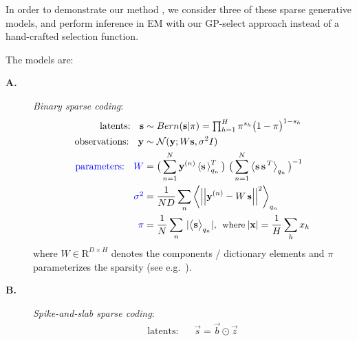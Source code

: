 %
In order to demonstrate our method , we consider three of these
 sparse generative models, and perform inference in EM with our GP-select approach instead of a hand-crafted selection function.

The models  are:
%
\begin{description}
%
\item[\textbf{A.}] \textit{Binary sparse coding}:
%
\vspace{-.1cm}
\begin{align}
\text{latents: } \,\,\,         \vec{s} &\sim Bern(\vec{s} | \pi) = \disT\prod_{h=1}^H \pi^{s_h} \big( 1 - \pi \big)^{1-s_h}\nonumber \\
\text{observations:  }\,\,\,    \vec{y} &\sim \mathcal{N}(\vec{y}; W\vec{s}, \sigma^2\One)\nonumber \\ 
\rev{\text{parameters: }} \,\,\,  %
\disT{}\rev{W} &= \big( \sum_{n=1}^{N} \vec{y}^{(n)} \E{\vec{s}\,}^T_{q_n} \big)\ \big( \sum_{n=1}^{N} \left< \vec{s}\,\vec{s}^{\,T}\right>_{q_n}\big)^{-1}\, \nonumber\\
\rev{\disT{}\sigma^2} &= \frac{1}{ND} \sum_{n} \left< \left|\left| \vec{y}^{(n)} - W \, \vec{s} \right|\right|^2 \right>_{q_n}\hspace{-2mm}\nonumber\\
\rev{\pi} &= \frac{1}{N} \sum_{n}\, |\big< \vec{s} \big>_{q_n}|,\:\:\mbox{\small where}\:|\vec{x}|=\frac{1}{H}\disS\sum_{h}x_h \nonumber
\end{align}
%
where $W \in \mathrm{R}^{D \times H}$ denotes the components / dictionary elements and $\pi$ parameterizes the sparsity (see e.g.~\citep{HennigesEtAl2010}).
%
\item[\textbf{B.}] \textit{Spike-and-slab sparse coding}:
\vspace{-.2cm}
\begin{align}
\text{latents: } & \,\,\,\vec{s} = \vec{b}\odot\vec{z}

\end{align}
\end{description}

